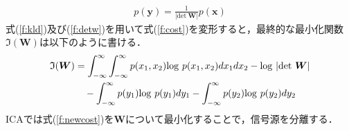 \begin{align}
    p(\bm{y}) = \frac{1}{|\mathrm{det}~\bm{W}|}p(\bm{x}) \label{f:detw}
\end{align}
式(\ref{f:kld})及び(\ref{f:detw})を用いて式(\ref{f:cost})を変形すると，最終的な最小化関数$\mathfrak{I}(\bm{W})$は以下のように書ける．
\begin{align}
\begin{split}
  \mathfrak{I}(\bm{W}) &= \int_{-\infty}^{\infty} \int_{-\infty}^{\infty} p(x_1,x_2){\rm log}~p(x_1,x_2)dx_1 dx_2 - {\rm log}~|\mathrm{det}~\bm{W}|\\
  &\quad -\int_{-\infty}^{\infty} p(y_1){\rm log}~p(y_1)dy_1 - \int_{-\infty}^{\infty} p(y_2){\rm log}~p(y_2)dy_2    \label{f:newcost}
\end{split}
\end{align}
ICAでは式(\ref{f:newcost})を$\bm{W}$について最小化することで，信号源を分離する．

